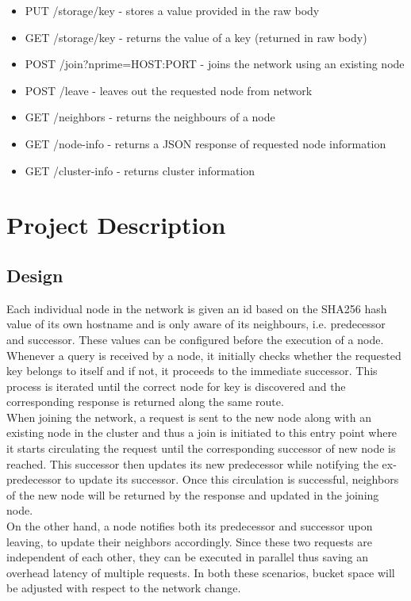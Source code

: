 \documentclass[
    a4paper,
    twocolumn,
]{article}
\begin{document}
\begin{itemize}
	\item PUT /storage/key - stores a value provided in the raw body
	\item GET /storage/key - returns the value of a key (returned in raw body)
	\item POST /join?nprime=HOST:PORT - joins the network using an existing node
	\item POST /leave - leaves out the requested node from network
	\item GET /neighbors - returns the neighbours of a node
	\item GET /node-info - returns a JSON response of requested node information
	\item GET /cluster-info - returns cluster information
\end{itemize}

\section{Project Description}
\subsection{Design}

Each individual node in the network is given an id based on the SHA256 hash value of its own hostname and is only aware of its neighbours, i.e. predecessor and successor. These values can be configured before the execution of a node. \\

Whenever a query is received by a node, it initially checks whether the requested key belongs to itself and if not, it proceeds to the immediate successor. This process is iterated until the correct node for key is discovered and the corresponding response is returned along the same route. \\

When joining the network, a request is sent to the new node along with an existing node in the cluster and thus a join is initiated to this entry point where it starts circulating the request until the corresponding successor of new node is reached. This successor then updates its new predecessor while notifying the ex-predecessor to update its successor. Once this circulation is successful, neighbors of the new node will be returned by the response and updated in the joining node.\\

On the other hand, a node notifies both its predecessor and successor upon leaving, to update their neighbors accordingly. Since these two requests are independent of each other, they can be executed in parallel thus saving an overhead latency of multiple requests. In both these scenarios, bucket space will be adjusted with respect to the network change. \\
\end{document}
